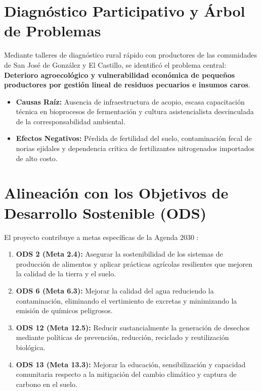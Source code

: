 \section{Diagnóstico Participativo y Árbol de Problemas}
Mediante talleres de diagnóstico rural rápido con productores de las comunidades de San José de González y El Castillo, se identificó el problema central: \textbf{Deterioro agroecológico y vulnerabilidad económica de pequeños productores por gestión lineal de residuos pecuarios e insumos caros}.
\begin{itemize}
    \item \textbf{Causas Raíz:} Ausencia de infraestructura de acopio, escasa capacitación técnica en bioprocesos de fermentación y cultura asistencialista desvinculada de la corresponsabilidad ambiental.
    \item \textbf{Efectos Negativos:} Pérdida de fertilidad del suelo, contaminación fecal de norias ejidales y dependencia crítica de fertilizantes nitrogenados importados de alto costo.
\end{itemize}

\section{Alineación con los Objetivos de Desarrollo Sostenible (ODS)}
El proyecto contribuye a metas específicas de la Agenda 2030 \parencite{onuIndicadores}:
\begin{enumerate}
    \item \textbf{ODS 2 (Meta 2.4):} Asegurar la sostenibilidad de los sistemas de producción de alimentos y aplicar prácticas agrícolas resilientes que mejoren la calidad de la tierra y el suelo.
    \item \textbf{ODS 6 (Meta 6.3):} Mejorar la calidad del agua reduciendo la contaminación, eliminando el vertimiento de excretas y minimizando la emisión de químicos peligrosos.
    \item \textbf{ODS 12 (Meta 12.5):} Reducir sustancialmente la generación de desechos mediante políticas de prevención, reducción, reciclado y reutilización biológica.
    \item \textbf{ODS 13 (Meta 13.3):} Mejorar la educación, sensibilización y capacidad comunitaria respecto a la mitigación del cambio climático y captura de carbono en el suelo.
\end{enumerate}

